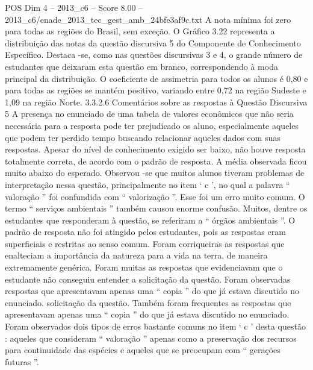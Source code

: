 \begin{textsample}{POS Dim 4 – 2013\_c6 – Score 8.00 – 2013\_c6/enade\_2013\_tec\_gest\_amb\_24bfe3af9c.txt}
A nota mínima foi zero para todas as regiões do Brasil, sem exceção.
O Gráfico 3.22 representa a distribuição das notas da questão discursiva 5 do Componente de Conhecimento Específico.
Destaca -se, como nas questões discursivas 3 e 4, o grande número de estudantes que deixaram esta questão em branco, correspondendo à moda principal da distribuição.
O coeficiente de assimetria para todos os alunos é 0,80 e para todas as regiões se mantém positivo, variando entre 0,72 na região Sudeste e 1,09 na região Norte. 3.3.2.6 Comentários sobre as respostas à Questão Discursiva 5 A presença no enunciado de uma tabela de valores econômicos que não seria necessária para a resposta pode ter prejudicado os aluno, especialmente aqueles que podem ter perdido tempo buscando relacionar aqueles dados com suas respostas.
Apesar do nível de conhecimento exigido ser baixo, não houve resposta totalmente correta, de acordo com o padrão de resposta.
A média observada ficou muito abaixo do esperado.
Observou -se que muitos alunos tiveram problemas de interpretação nessa questão, principalmente no item ‘ c ’, no qual a palavra “ valoração ” foi confundida com “ valorização ”.
Esse foi um erro muito comum.
O termo “ serviços ambientais ” também causou enorme confusão.
Muitos, dentre os estudantes que responderam à questão, se referiram a “ órgãos ambientais ”.
O padrão de resposta não foi atingido pelos estudantes, pois as respostas eram superficiais e restritas ao senso comum.
Foram corriqueiras as respostas que enalteciam a importância da natureza para a vida na terra, de maneira extremamente genérica.
Foram muitas as respostas que evidenciavam que o estudante não conseguiu entender a solicitação da questão.
Foram observadas respostas que apresentavam apenas uma “ copia ” do que já estava discutido no enunciado. solicitação da questão.
Também foram frequentes as respostas que apresentavam apenas uma “ copia ” do que já estava discutido no enunciado.
Foram observados dois tipos de erros bastante comuns no item ‘ c ’ desta questão : aqueles que consideram “ valoração ” apenas como a preservação dos recursos para continuidade das espécies e aqueles que se preocupam com “ gerações futuras ”.

\end{textsample}
